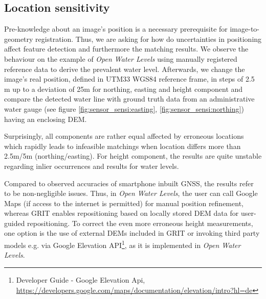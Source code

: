 \documentclass[review]{elsarticle}
\begin{document}
\subsection{Location sensitivity}
\label{sec:technology:sensors:location_sensitivity}

Pre-knowledge about an image's position is a necessary prerequisite for image-to-geometry registration. Thus, we are asking for how do uncertainties in positioning affect feature detection and furthermore the matching results. We observe the behaviour on the example of \textit{Open Water Levels} using manually registered reference data to derive the prevalent water level. Afterwards, we change the image's real position, defined in UTM33 WGS84 reference frame, in steps of 2.5 m up to a deviation of 25m for northing, easting and height component and compare the detected water line with ground truth data from an administrative water gauge (see figure \ref{fig:sensor_sensi:easting}, \ref{fig:sensor_sensi:northing}) having an enclosing \gls{DEM}.

Surprisingly, all components are rather equal affected by erroneous locations which rapidly leads to infeasible matchings when location differs more than 2.5m/5m (northing/easting). For height component, the results are quite unstable regarding inlier occurrences and results for water levels. 

Compared to observed accuracies of smartphone inbuilt \gls{GNSS}, the results refer to be non-negligible issues. Thus, in \textit{Open Water Levels}, the user can call Google Maps (if access to the internet is permitted) for manual position refinement, whereas \gls{GRIT} enables repositioning based on locally stored \gls{DEM} data for user-guided repositioning. To correct the even more erroneous height measurements, one option is the use of external \glspl{DEM} included in \gls{GRIT} or invoking third party models e.g. via Google Elevation API\footnote{Developer Guide - Google Elevation Api, \url{https://developers.google.com/maps/documentation/elevation/intro?hl=de}}, as it is implemented in \textit{Open Water Levels}.
\end{document}

